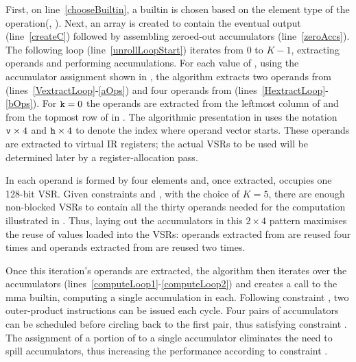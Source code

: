 \documentclass[\main/thesis.tex]{subfiles}
\begin{document}
First, on line~\ref{chooseBuiltin}, a builtin is chosen based on the element type of the operation\footnotemark (\eg {}, ).
Next, an array is created to contain the eventual output (line~\ref{createC}) followed by assembling zeroed-out accumulators (line~\ref{zeroAccs}).
The following loop (line~\ref{unrollLoopStart}) iterates from $0$ to $K-1$, extracting operands and performing accumulations.
For each value of , using the accumulator assignment shown in , the algorithm extracts two operands from  (lines~\ref{VextractLoop}-\ref{aOps}) and four operands from  (lines~\ref{HextractLoop}-\ref{bOps}).
For $\text{\code{k}}=0$ the operands are extracted from the leftmost column of  and from the topmost row of  in .
The algorithmic presentation in  uses the notation \code{ATile[}$\text{\code{v}} \times 4$\code{][k]} and \code{BTile[}$\text{\code{h}} \times 4$\code{][k]} to denote the index where operand vector starts.
These operands are extracted to virtual IR registers; the actual VSRs to be used will be determined later by a register-allocation pass.

In  each operand is formed by four elements and, once extracted, occupies one 128-bit VSR.
Given constraints  and , with the choice of $K = 5$, there are enough non-blocked VSRs to contain all the thirty operands needed for the computation illustrated in .
Thus, laying out the accumulators in this $2 \times 4$ pattern maximises the reuse of values loaded into the VSRs: operands extracted from  are reused four times and operands extracted from  are reused two times.

Once this iteration's operands are extracted, the algorithm then iterates over the accumulators (lines~\ref{computeLoop1}-\ref{computeLoop2}) and creates a call to the \gls{mma} \gls{builtin}, computing a single accumulation in each.
Following constraint , two outer-product instructions can be issued each cycle.
Four pairs of accumulators can be scheduled before circling back to the first pair, thus satisfying constraint .
The assignment of a portion of  to a single accumulator eliminates the need to spill accumulators, thus increasing the performance according to constraint .
\end{document}

